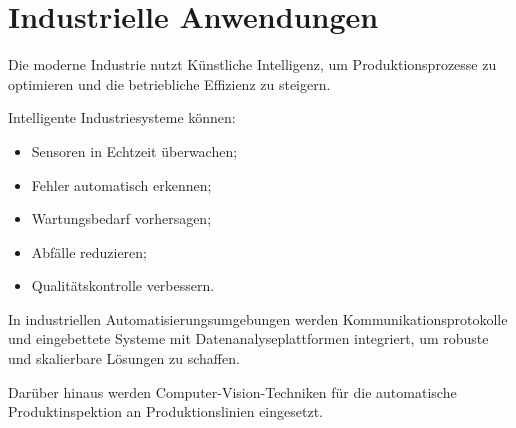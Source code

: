 \section{Industrielle Anwendungen}

Die moderne Industrie nutzt Künstliche Intelligenz, um Produktionsprozesse zu optimieren und die
betriebliche Effizienz zu steigern.

Intelligente Industriesysteme können:

\begin{itemize}
    \item Sensoren in Echtzeit überwachen;
    \item Fehler automatisch erkennen;
    \item Wartungsbedarf vorhersagen;
    \item Abfälle reduzieren;
    \item Qualitätskontrolle verbessern.
\end{itemize}

In industriellen Automatisierungsumgebungen werden Kommunikationsprotokolle und eingebettete Systeme
mit Datenanalyseplattformen integriert, um robuste und skalierbare Lösungen zu schaffen.
 
Darüber hinaus werden Computer-Vision-Techniken für die automatische Produktinspektion
an Produktionslinien eingesetzt.
